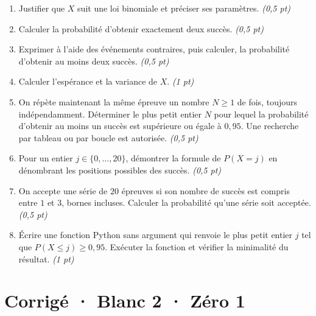 \begin{enumerate}

\item Justifier que $X$ suit une loi binomiale et préciser ses paramètres. \hfill\textit{(0,5 pt)}

\item Calculer la probabilité d'obtenir exactement deux succès. \hfill\textit{(0,5 pt)}

\item Exprimer à l'aide des événements contraires, puis calculer, la probabilité d'obtenir au moins deux succès. \hfill\textit{(0,5 pt)}

\item Calculer l'espérance et la variance de $X$. \hfill\textit{(1 pt)}

\item On répète maintenant la même épreuve un nombre $N\ge1$ de fois, toujours indépendamment. Déterminer le plus petit entier $N$ pour lequel la probabilité d'obtenir au moins un succès est supérieure ou égale à $0{,}95$. Une recherche par tableau ou par boucle est autorisée. \hfill\textit{(0,5 pt)}

\item Pour un entier $j\in\{0,\ldots,20\}$, démontrer la formule de $P(X=j)$ en dénombrant les positions possibles des succès. \hfill\textit{(0,5 pt)}

\item On accepte une série de $20$ épreuves si son nombre de succès est compris entre $1$ et $3$, bornes incluses. Calculer la probabilité qu'une série soit acceptée. \hfill\textit{(0,5 pt)}

\item Écrire une fonction Python sans argument qui renvoie le plus petit entier $j$ tel que $P(X\le j)\ge0{,}95$. Exécuter la fonction et vérifier la minimalité du résultat. \hfill\textit{(1 pt)}

\end{enumerate}

\ifprof\clearpage

\section*{Corrigé · Blanc 2 · Zéro 1}\label{cor:8-1}

